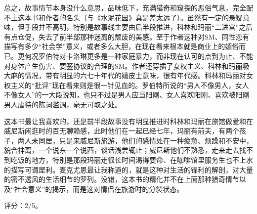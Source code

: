 总之，故事情节本身没什么意思，品味低下，充满猎奇和窥探的恶俗气息，完全配不上这本书和作者的名头（与《水泥花园》真是差太远了）。虽然有一定的悬疑意味，但手段并不高明，特别是故事线主要由后半段推进，科林和玛丽“二进宫”之后有点仓促，失去了前半部那种迷离的颓废的美感。至于作者这种对SM、同性恋有描写有多少“社会学”意义，或者多么大胆，在现在看来根本就是商业上的媚俗而已。更何况罗伯特对卡洛琳更多是一种家庭暴力，而非现在认可的点到为止、不能对身体产生伤害、要签协议的合理的SM。作者还穿插了女权主义、科林和玛丽吸大麻的情况，带有明显的六七十年代的嬉皮士意味，很有年代感。科林和玛丽对女权主义的“批评”现在看来则是很一针见血的。罗伯特所说的“男人不像男人，女人不像女人”的一大段说知，也只不过是男人应当阳刚、女人喜欢阳刚、喜欢被阳刚男人虐待的陈词滥调，毫无可取之处。

这本书最让我喜欢的，还是前半段故事没有明显推进时科林和玛丽在旅馆做爱和在威尼斯闲逛时的百无聊赖感，此时他们在一起已经七年，玛丽有前夫，有两个孩子，两人未同居，只是来威尼斯旅游，他们的感情处在一种疲惫、烦躁和不安中，貌合神离，一个说东一个说西，谈话浅尝辄止；威尼斯他们不熟悉，走来走去找不到吃饭的地方，特别是那段玛丽走很长时间渴得要命、在咖啡馆里服务生也不上水的描写可谓犀利。麦克尤恩最让我称道的，就是这种对生活的锋利的解剖，对大量的密不透风的生活细节的罗列。没错，这本书的精化并不在上面那种猎奇情节以及“社会意义”的揭示，而是这对情侣在旅游时的分裂状态。

评分：2/5。
